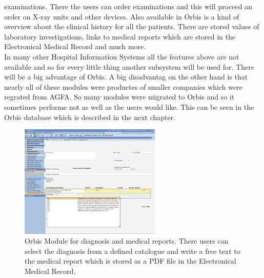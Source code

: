 \documentclass[a4paper]{article}
\begin{document}
	examinations. There the users can order examinations and this will proceed an
	order on X-ray units and other devices. Also available in Orbis is a kind of
	overview about the clinical history for all the patients. There are
	stored values of laboratory investigations, links to medical reports which are stored
	in the Electronical Medical Record and much more.\\
	In many other Hospital Information Systems all the features above are not
	available and so for every little thing another subsystem will be used for.
	There will be a big advantage of Orbis. A big disadvantag on the other hand is
	that nearly all of these modules were productes of smaller companies which were
	regrated from AGFA. So many modules were migrated to Orbis and so it sometimes
	performe not as well as the users would like. This can be seen in the Orbis
	database which is described in the next chapter.\\
	\begin{figure}[!ht]
		  \centering
		      \includegraphics[width=0.6\textwidth]{orbis2}
		  \caption{Orbis Module for diagnosis and medical reports. There users can
		  select the diagnosis from a defined catalogue and write a free text to the
		  medical report which is stored as a PDF file in the Electronical Medical
		  Record.}
	\end{figure}
\end{document}
